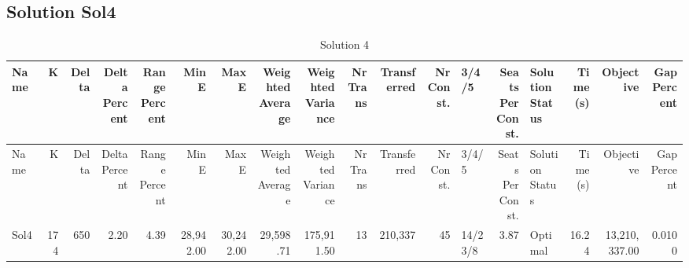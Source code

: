 \documentclass[a4paper]{article}
\begin{document}
\clearpage
\subsection{Solution Sol4}

{\scriptsize
\begin{longtable}{lrrrrrrrrrrrlrlrrr}
\caption{Solution 4}
\\ \toprule
Name &K &Delta &\shortstack{Delta\\Percent} &\shortstack{Range\\Percent} &Min E &Max E &\shortstack{Weighted\\Average} &\shortstack{Weighted\\Variance} &\shortstack{Nr\\Trans} &Transferred &\shortstack{Nr\\Const.} &3/4/5 &\shortstack{Seats\\Per\\Const.} &\shortstack{Solution\\Status} &\shortstack{Time\\(s)} &Objective &\shortstack{Gap\\Percent} \\ \midrule
\endfirsthead
\toprule
Name &K &Delta &\shortstack{Delta\\Percent} &\shortstack{Range\\Percent} &Min E &Max E &\shortstack{Weighted\\Average} &\shortstack{Weighted\\Variance} &\shortstack{Nr\\Trans} &Transferred &\shortstack{Nr\\Const.} &3/4/5 &\shortstack{Seats\\Per\\Const.} &\shortstack{Solution\\Status} &\shortstack{Time\\(s)} &Objective &\shortstack{Gap\\Percent} \\ \midrule
\endhead
\bottomrule
\endfoot
Sol4&174&650& 2.20& 4.39&28,942.00&30,242.00&29,598.71&175,911.50&13&210,337&45&14/23/8& 3.87&Optimal&16.24&13,210,337.00&0.0100\\ 
\end{longtable}

}
\end{document}
